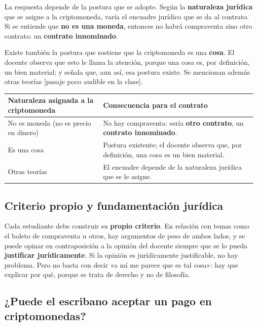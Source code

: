 \documentclass[12pt,oneside]{book}
\begin{document}
La respuesta depende de la postura que se adopte. Según la \textbf{naturaleza jurídica} que se asigne a la criptomoneda, varía el encuadre jurídico que se da al contrato. Si se entiende que \textbf{no es una moneda}, entonces no habrá compraventa sino otro contrato: un \textbf{contrato innominado}.

Existe también la postura que sostiene que la criptomoneda es una \textbf{cosa}. El docente observa que esto le llama la atención, porque una cosa es, por definición, un bien material; y señala que, aun así, esa postura existe. Se mencionan además otras teorías [pasaje poco audible en la clase].


\begin{table}[H]
\centering
\begin{tabularx}{\textwidth}{
    >{\raggedright\arraybackslash}p{}
    >{\raggedright\arraybackslash}X
}
\toprule
\textbf{Naturaleza asignada a la criptomoneda} & \textbf{Consecuencia para el contrato} \\
\midrule
No es moneda (no es precio en dinero) & No hay compraventa: sería \textbf{otro contrato}, un \textbf{contrato innominado}. \\
Es una cosa & Postura existente; el docente observa que, por definición, una cosa es un bien material. \\
Otras teorías & [Pasaje poco audible] El encuadre depende de la naturaleza jurídica que se le asigne. \\
\bottomrule
\end{tabularx}
\end{table}

\subsection{Criterio propio y fundamentación jurídica}

Cada estudiante debe construir su \textbf{propio criterio}. En relación con temas como el boleto de compraventa u otros, hay argumentos de peso de ambos lados, y se puede opinar en contraposición a la opinión del docente siempre que se lo pueda \textbf{justificar jurídicamente}. Si la opinión es jurídicamente justificable, no hay problema. Pero no basta con decir «a mí me parece que es tal cosa»: hay que explicar por qué, porque se trata de derecho y no de filosofía.

\subsection{¿Puede el escribano aceptar un pago en criptomonedas?}
\end{document}
